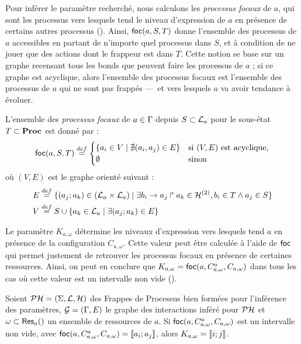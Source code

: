 Pour inférer le paramètre recherché, nous calculons les \emph{processus focaux} de $a$,
qui sont les processus vers lesquels tend le niveau d'expression de $a$ en présence
de certains autres processus ().
Ainsi, $\focals(a, S, T)$ donne l'ensemble des processus de $a$ accessibles
en partant de n'importe quel processus dans $S$, et à condition de ne jouer que des
actions dont le frappeur est dans $T$.
Cette notion se base sur un graphe recensant tous les bonds que peuvent faire les processus
de $a$ ;
si ce graphe est acyclique, alors l'ensemble des processus focaux est l'ensemble des processus
de $a$ qui ne sont pas frappés ---~et vers lesquels $a$ va avoir tendance à évoluer.

\begin{definition}[$\focals(a,S,T)$]
  L'ensemble des \emph{processus focaux} de $a \in \mathrm{\Gamma}$ depuis $S \subset \mathcal{L}_a$
  pour le sous-état $T \subset \mathbf{Proc}$ est donné par :
  \[
    \mathsf{foc}(a, S, T) \stackrel{def}=
    \begin{cases}
      \{ a_i \in V \mid \nexists (a_i,a_j)\in E\} & \text{si $(V,E)$ est acyclique},\\
      \emptyset & \text{sinon}\\
    \end{cases}
  \]
  où $(V,E)$ est le graphe orienté suivant :
  \begin{align*}
    E & \stackrel{def}= \{ (a_j; a_k) \in (\mathcal{L}_a \times \mathcal{L}_a) \mid
      \exists b_i\rightarrow a_j\Rsh a_k \in \mathcal{H}^{(2)}, b_i \in T \wedge a_j \in S \} \\
    V & \stackrel{def}= S \cup \{ a_k \in \mathcal{L}_a \mid \exists (a_j; a_k) \in E \}
  \end{align*}
\end{definition}

Le paramètre $K_{a,\omega}$ détermine les niveaux d'expression vers lesquels tend $a$
en présence de la configuration $C_{a,\omega}$.
Cette valeur peut être calculée à l'aide de $\mathsf{foc}$ qui permet justement
de retrouver les processus focaux en présence de certaines ressources.
Ainsi, on peut en conclure que $K_{a,\omega} = \mathsf{foc}(a,C^a_{a,\omega},C_{a,\omega})$
dans tous les cas où cette valeur est un intervalle non vide ().

\begin{proposition}
  Soient $\mathcal{PH} = (\Sigma, \mathcal{L}, \mathcal{H})$ des Frappes de Processus bien formées pour l'inférence des
  paramètres, $\mathcal{G} = (\mathrm{\Gamma}, E)$ le graphe des interactions inféré pour $\mathcal{PH}$
  et $\omega \subset \RRBres{a}$ un ensemble de ressources de $a$.
  Si $\mathsf{foc}(a,C^a_{a,\omega},C_{a,\omega})$ est un intervalle non vide,
  avec $\mathsf{foc}(a,C^a_{a,\omega},C_{a,\omega}) = \mathopen{\llbracket}a_i\mathclose{};a_j\mathclose{\rrbracket}$,
  alors $K_{a,\omega} = \mathopen{\llbracket}i\mathclose{};j\mathclose{\rrbracket}$.
\end{proposition}



